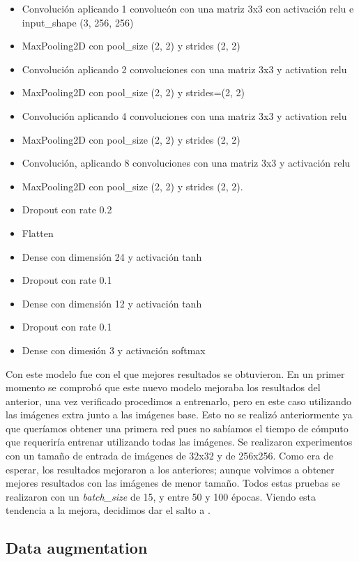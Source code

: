 \begin{itemize}
\item Convolución aplicando 1 convolucón con una matriz 3x3 con activación relu e input\_shape (3, 256, 256)
\item MaxPooling2D con pool\_size (2, 2) y strides (2, 2)
\item Convolución aplicando 2 convoluciones con una matriz 3x3 y activation relu
\item MaxPooling2D con pool\_size (2, 2) y strides=(2, 2)
\item Convolución aplicando 4 convoluciones con una matriz 3x3 y activation relu
\item MaxPooling2D con pool\_size (2, 2) y strides (2, 2)
\item Convolución, aplicando 8 convoluciones con una matriz 3x3 y activación relu
\item MaxPooling2D con pool\_size (2, 2) y strides (2, 2).
\item Dropout con rate 0.2
\item Flatten
\item Dense con dimensión 24 y activación tanh
\item Dropout con rate 0.1
\item Dense con dimensión 12 y activación tanh
\item Dropout con rate 0.1
\item Dense con dimesión 3 y activación softmax
\end{itemize}

Con este modelo fue con el que mejores resultados se obtuvieron. En un primer momento se comprobó que este nuevo modelo mejoraba los resultados del anterior, una vez verificado procedimos a entrenarlo, pero en este caso utilizando las imágenes extra junto a las imágenes base. Esto no se realizó anteriormente ya que queríamos obtener una primera red pues no sabíamos el tiempo de cómputo que requeriría entrenar utilizando todas las imágenes. Se realizaron experimentos con un tamaño de entrada de imágenes de 32x32 y de 256x256. Como era de esperar, los resultados mejoraron a los anteriores; aunque volvimos a obtener mejores resultados con las imágenes de menor tamaño. Todos estas pruebas se realizaron con un
\textit{batch\_size} de 15, y entre 50 y 100 épocas. Viendo esta tendencia a la mejora, decidimos dar el salto a .\\

\subsection{Data augmentation}

